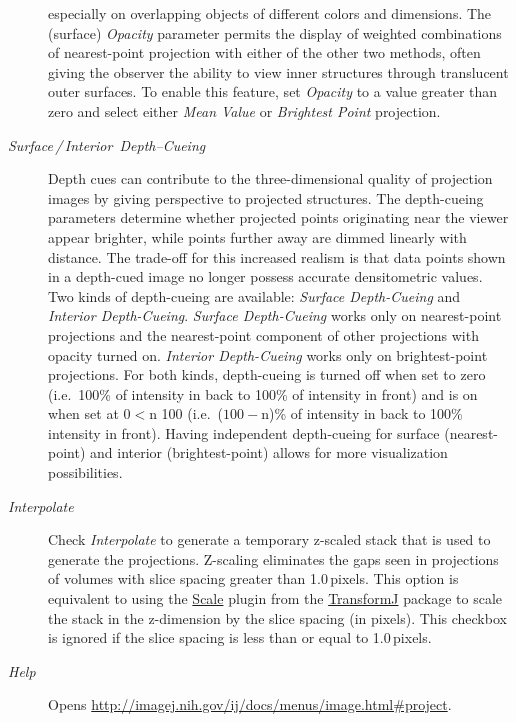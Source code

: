 \begin{description}
especially on overlapping objects of different colors and dimensions.
The (surface) \emph{Opacity} parameter permits the display of weighted
combinations of nearest-point projection with either of the other
two methods, often giving the observer the ability to view inner structures
through translucent outer surfaces. To enable this feature, set \emph{Opacity}
to a value greater than zero and select either \emph{Mean Value} or
\emph{Brightest Point} projection.
\item [{\emph{Surface\,/\,Interior\ Depth--Cueing}}] Depth cues can
contribute to the three-dimensional quality of projection images by
giving perspective to projected structures. The depth-cueing parameters
determine whether projected points originating near the viewer appear
brighter, while points further away are dimmed linearly with distance.
The trade-off for this increased realism is that data points shown
in a depth-cued image no longer possess accurate densitometric values.
Two kinds of depth-cueing are available: \emph{Surface Depth-Cueing}
and \emph{Interior Depth-Cueing}. \emph{Surface Depth-Cueing} works
only on nearest-point projections and the nearest-point component
of other projections with opacity turned on. \emph{Interior Depth-Cueing
}works only on brightest-point projections. For both kinds, depth-cueing
is turned off when set to zero (i.e.\ 100\% of intensity in back
to 100\% of intensity in front) and is on when set at $0<$n 100 (i.e.\ ($100-$n)\%
of intensity in back to 100\% intensity in front). Having independent
depth-cueing for surface (nearest-point) and interior (brightest-point)
allows for more visualization possibilities.
\item [{\emph{Interpolate}}] Check \emph{Interpolate} to generate a temporary
z-scaled stack that is used to generate the projections. Z-scaling
eliminates the gaps seen in projections of volumes with slice spacing
greater than 1.0\,pixels. This option is equivalent to using the
\href{http://www.imagescience.org/meijering/software/transformj/scale.html}{Scale}
plugin from the \href{http://www.imagescience.org/meijering/software/transformj/}{TransformJ}
package to scale the stack in the z-dimension by the slice spacing
(in pixels). This checkbox is ignored if the slice spacing is less
than or equal to 1.0\,pixels.
\item [{\emph{Help}}] Opens \url{http://imagej.nih.gov/ij/docs/menus/image.html#project}.
\end{description}



